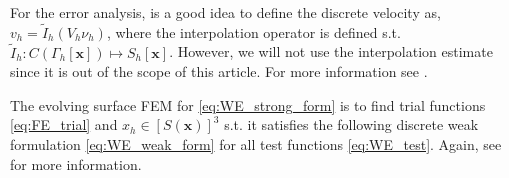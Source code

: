 For the error analysis, is a good idea to define the discrete velocity as, $v_{h} = \widetilde{I}_{h}\left( V_{h} \nu _{h} \right)  $,  where the interpolation operator is defined s.t. $ \widetilde{I}_{h}: C\left( \Gamma _{h}\left[ \mathbf{x} \right] \right) \mapsto  S_{h}\left[
\mathbf{x} \right]     $. However, we will not use the interpolation estimate since it is out of the scope of this article. For more information see \cite[Remark 3.1]{kovacs2021convergent}.


The evolving surface FEM for \eqref{eq:WE_strong_form} is to find trial functions \eqref{eq:FE_trial} and $x_{h} \in  \left[ S\left( \mathbf{x} \right)  \right] ^3$ s.t. it satisfies the following discrete weak formulation \eqref{eq:WE_weak_form} for
all test functions \eqref{eq:WE_test}. Again, see \cite{kovacs2021convergent} for more information.

